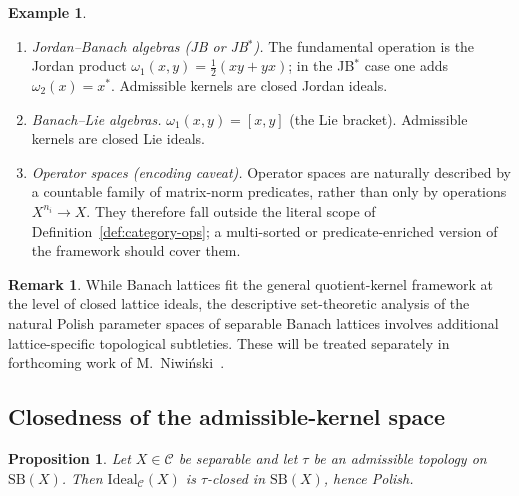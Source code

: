 \documentclass[12pt,fleqn,a4paper]{amsart}
\numberwithin{equation}{section}
\newtheorem{proposition}[theorem]{Proposition}
\theoremstyle{definition}
\newtheorem{remark}[theorem]{Remark}
\newtheorem{example}[theorem]{Example}
\newcommand{\SB}{\mathrm{SB}}
\newcommand{\Ideal}{\mathrm{Ideal}}
\begin{document}
\begin{example}
\begin{enumerate}
\item \emph{Jordan--Banach algebras (JB or JB$^*$).}
The fundamental operation is the Jordan product
$\omega_1(x,y)=\tfrac12(xy+yx)$; in the JB$^*$ case one adds
$\omega_2(x)=x^*$.
Admissible kernels are closed Jordan ideals.

\item \emph{Banach--Lie algebras.}
$\omega_1(x,y)=[x,y]$ (the Lie bracket).
Admissible kernels are closed Lie ideals.

\item \emph{Operator spaces (encoding caveat).}
Operator spaces are naturally described by a countable family of matrix-norm
predicates, rather than only by operations $X^{n_i}\to X$.  They therefore fall
outside the literal scope of Definition~\ref{def:category-ops}; a multi-sorted
or predicate-enriched version of the framework should cover them.
\end{enumerate}
\end{example}

\begin{remark}\label{rem:BL-separate}
While Banach lattices fit the general quotient-kernel framework at the level of
closed lattice ideals, the descriptive set-theoretic analysis of the natural Polish
parameter spaces of separable Banach lattices involves additional lattice-specific
topological subtleties.  These will be treated separately in forthcoming work of
M.~Niwi{\'n}ski~\cite{NiwinskiBL}.
\end{remark}

\subsection{Closedness of the admissible-kernel space}

\begin{proposition}\label{prop:ideal-closed}
Let $X\in\mathcal C$ be separable and let $\tau$ be an admissible topology on $\SB(X)$.
Then $\Ideal_{\mathcal C}(X)$ is $\tau$-closed in $\SB(X)$, hence Polish.
\end{proposition}
\end{document}

